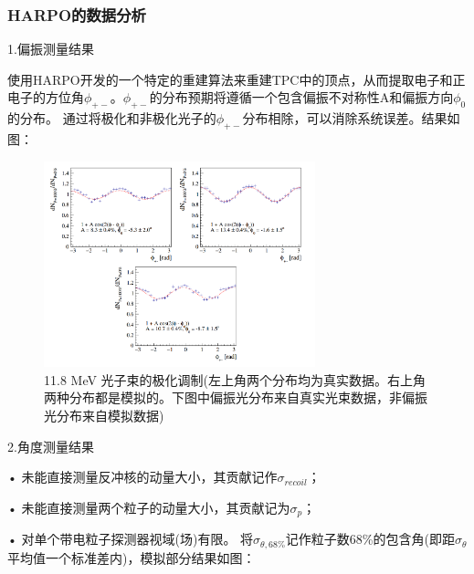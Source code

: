 \subsubsection{HARPO的数据分析}
1.偏振测量结果\par
使用HARPO开发的一个特定的重建算法来重建TPC中的顶点，从而提取电子和正电子的方位角$\phi_{+-}$。$\phi_{+-}$的分布预期将遵循一个包含偏振不对称性A和偏振方向$\phi_{0}$的分布。
通过将极化和非极化光子的$\phi_{+-}$分布相除，可以消除系统误差。结果如图：
\begin{figure}[H] %
	\centering %
	\includegraphics[width=0.7\textwidth]{figures/18HA测量结果.png} %
	\caption{11.8 MeV 光子束的极化调制(左上角两个分布均为真实数据。右上角两种分布都是模拟的。下图中偏振光分布来自真实光束数据，非偏振光分布来自模拟数据)} %
\end{figure}
2.角度测量结果\par
• 未能直接测量反冲核的动量大小，其贡献记作$\sigma_{recoil}$；\par
• 未能直接测量两个粒子的动量大小，其贡献记为$\sigma_{p}$；\par
• 对单个带电粒子探测器视域(场)有限。
将$\sigma_{\theta,68\%}$记作粒子数68\%的包含角(即距$\sigma_{\theta}$平均值一个标准差内)，模拟部分结果如图：
